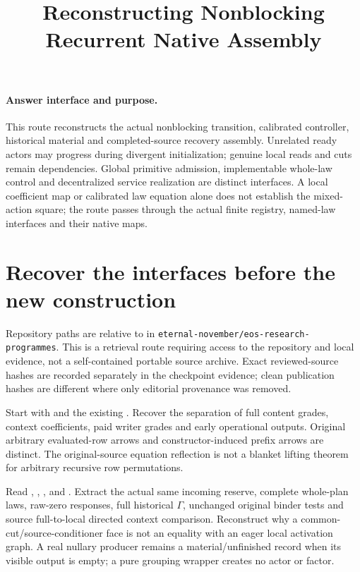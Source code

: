 \documentclass{article}
\title{Reconstructing Nonblocking Recurrent Native Assembly}
\author{}\date{}
\begin{document}
\maketitle
\paragraph{Answer interface and purpose.}
This route reconstructs the actual nonblocking transition, calibrated controller, historical material and completed-source recovery assembly. Unrelated ready actors may progress during divergent initialization; genuine local reads and cuts remain dependencies. Global primitive admission, implementable whole-law control and decentralized service realization are distinct interfaces. A local coefficient map or calibrated law equation alone does not establish the mixed-action square; the route passes through the actual finite registry, named-law interfaces and their native maps.

\section{Recover the interfaces before the new construction}
Repository paths are relative to
in \texttt{eternal-november/eos-research-programmes}. This is a retrieval route requiring access to the repository and local evidence, not a self-contained portable source archive. Exact reviewed-source hashes are recorded separately in the checkpoint evidence; clean publication hashes are different where only editorial provenance was removed.

Start with  and the existing . Recover the separation of full content grades, context coefficients, paid writer grades and early operational outputs. Original arbitrary evaluated-row arrows and constructor-induced prefix arrows are distinct. The original-source equation reflection is not a blanket lifting theorem for arbitrary recursive row permutations.

Read , , , and . Extract the actual same incoming reserve, complete whole-plan laws, raw-zero responses, full historical $\Gamma$, unchanged original binder tests and source full-to-local directed context comparison. Reconstruct why a common-cut/source-conditioner face is not an equality with an eager local activation graph. A real nullary producer remains a material/unfinished record when its visible output is empty; a pure grouping wrapper creates no actor or factor.
\end{document}
